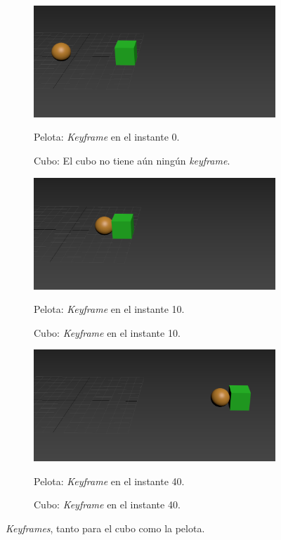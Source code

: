 \documentclass{article}
\begin{document}
\begin{figure}[H]
    \centering 
	\begin{subfigure}[H]{0.48\textwidth}
	    \centering
	    \includegraphics[width=\textwidth]{imagenes/Ejercicio 1/p2_ins1.png}
	    \caption{Pelota: \textit{Keyframe} en el instante 0.}
        \caption{Cubo: El cubo no tiene aún ningún \textit{keyframe}.}
	\end{subfigure}
    \hfill
	\begin{subfigure}[H]{0.48\textwidth}
	    \centering
	    \includegraphics[width=\textwidth]{imagenes/Ejercicio 1/p2_ins10.png}
	    \caption{Pelota: \textit{Keyframe} en el instante 10.}
        \caption{Cubo: \textit{Keyframe} en el instante 10.}
	\end{subfigure}
    \hfill
	\begin{subfigure}[H]{0.48\textwidth}
	    \centering
	    \includegraphics[width=\textwidth]{imagenes/Ejercicio 1/p2_ins40.png}
	    \caption{Pelota: \textit{Keyframe} en el instante 40.}
	    \caption{Cubo: \textit{Keyframe} en el instante 40.}
	\end{subfigure}
    \caption{\textit{Keyframes}, tanto para el cubo como la pelota.}
\end{figure}
\end{document}

